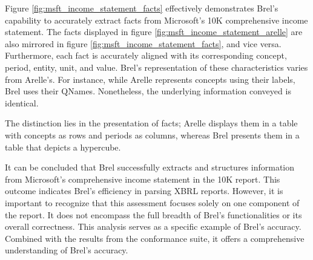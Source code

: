 

Figure \ref{fig:msft_income_statement_facts} effectively demonstrates Brel's capability to accurately extract facts from Microsoft's 10K comprehensive income statement.  
The facts displayed in figure \ref{fig:msft_income_statement_arelle} are also mirrored in figure \ref{fig:msft_income_statement_facts}, and vice versa.  
Furthermore, each fact is accurately aligned with its corresponding concept, period, entity, unit, and value.  
Brel's representation of these characteristics varies from Arelle's.  
For instance, while Arelle represents concepts using their labels, Brel uses their QNames.  
Nonetheless, the underlying information conveyed is identical.

The distinction lies in the presentation of facts; Arelle displays them in a table with concepts as rows and periods as columns,  
whereas Brel presents them in a table that depicts a hypercube.

It can be concluded that Brel successfully extracts and structures information from Microsoft's comprehensive income statement in the 10K report.  
This outcome indicates Brel's efficiency in parsing XBRL reports.  
However, it is important to recognize that this assessment focuses solely on one component of the report.  
It does not encompass the full breadth of Brel's functionalities or its overall correctness.  
This analysis serves as a specific example of Brel's accuracy.  
Combined with the results from the conformance suite, it offers a comprehensive understanding of Brel's accuracy.
